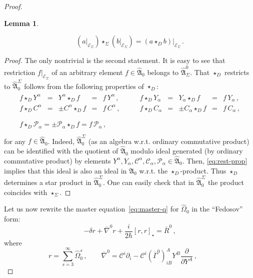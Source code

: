\documentclass[a4paper,11pt]{amsart}
\newtheorem{lemma}[thm]{Lemma}
\numberwithin{thm}{section} %
\numberwithin{equation}{section} %
\numberwithin{figure}{section} %
\newcommand{\commut}[2]{[#1,#2]}
\renewcommand{\:}{{\rm\, :\,}}
\def\bar{\overline}
\def\d{\partial}
\newcommand{\dl}[1]{\displaystyle\frac{{\d}}{\d #1}}
\def\cP{{\mathcal P}}
\def\cc{{\mathcal C}}
\def\qA{{\hat{\mathfrak A}}}
\def\E{{ \mathcal E}}
\def\con{{\bar\Gamma}}
\def\Dcon-d{{\bar\nabla}^0}
\begin{document}
\begin{proof}
\begin{lemma}
\begin{enumerate}
\begin{equation}
  (a{\bigr|}_{\E_\Sigma})\star_\Sigma (b{\bigr|}_{\E_\Sigma})=
  ( a \star_D b){\bigr|}_{\E_\Sigma}\,.
\end{equation}
\end{enumerate}
\end{lemma}
\begin{proof}
The only nontrivial is the second statement. It is easy to see that
restriction $f{\bigr|}_{\E_\Sigma}$ of an arbitrary element $f\in \qA_0$
belongs to $\qA^0_\Sigma$. That $\star_D$
restricts to $\qA^\Sigma_0$ follows from the following properties
of $\star_D$:
\begin{equation}
\label{eq:rest-prop}
\begin{split}
  \begin{array}{rccclrcccl}
  f \star_D Y^\alpha&=&Y^\alpha \star_D f&=&f\,Y^\alpha \,,\qquad&
  f \star_D  Y_\alpha& =& Y_\alpha \star_D f&=&f\,Y_\alpha\,,\\[3pt]
  f \star_D C^\alpha&=&\pm C^\alpha  \star_D f& =&f\,C^\alpha \,,\qquad&
  f \star_D  C_\alpha&=&\pm C_\alpha\star_D f & =&f\,C_\alpha\,,\\[3pt]
\end{array}\\
\begin{array}{c}
f\star_D \cP_\alpha= \pm \cP_\alpha\star_D f =
f\,\cP_\alpha\,,\qquad{}\qquad{}\qquad{}\qquad{}\qquad{}
\end{array}\\
\end{split}
\end{equation}
for any $f\in \qA_0$. Indeed, $\qA_0^\Sigma$
(as an algebra w.r.t. ordinary commutative product) can be identified with the quotient of
$\qA_0$ modulo ideal generated (by ordinary commutative product)
by elements
$Y^\alpha,Y_\alpha,\cc^\alpha,\cc_\alpha,\cP_\alpha\in \qA_0$.  Then,
\eqref{eq:rest-prop} implies that this
ideal is also an ideal in $\qA_0$ w.r.t. the $\star_D$-product.
Thus $\star_D$ determines a star product in $\qA^\Sigma_0$.  One can
easily check that in $\qA_0^\Sigma$ the product coincides with
$\star_\Sigma$.
\end{proof}
Let us now rewrite the master equation~\eqref{eq:master-q}
for ${\hat\Omega}_0$ in the
``Fedosov'' form:
\begin{equation}
-\delta r + \Dcon-d r+\frac{i}{2\hbar}\commut{r}{r}_\star={\bar R}^0\,,
\end{equation}
where
\begin{equation}
r=\sum_{s=3}^\infty {\hat\Omega}^s_0\,, \qquad 
\Dcon-d =\cc^i\d_i-\cc^i (\con^0)^A_{iB}Y^B\dl{Y^A}\,, \qquad

\end{equation}
\end{proof}
\end{document}
